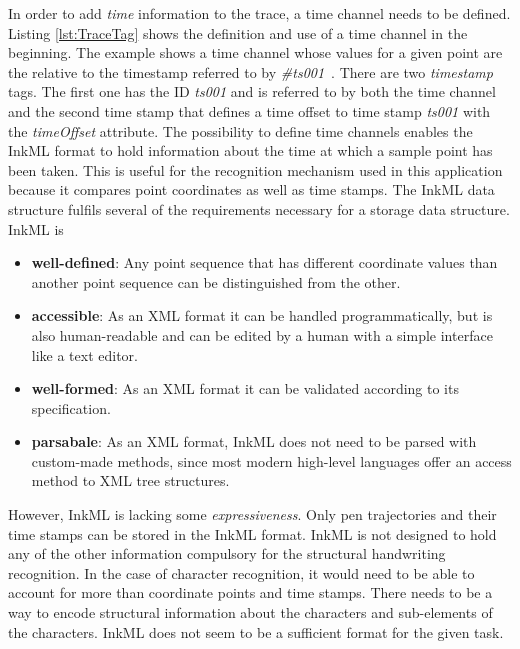 In order to add \emph{time} information to the trace,
a time channel needs to be defined. Listing \ref{lst:TraceTag} shows the 
definition and use of a time channel in the beginning. 
The example shows a time channel whose values for a given point are the 
relative to the timestamp referred to by 
\emph{\#ts001}~. There are two \emph{timestamp} tags.
The first one has the ID \emph{ts001} and is referred to by both the
time channel and the second time stamp that defines a time offset to time stamp
\emph{ts001} with the \emph{timeOffset} attribute.
The possibility to define time channels enables the InkML format to hold 
information about the time at which a sample point has been taken.
This is useful for the recognition mechanism used in this application
because it compares point coordinates as well as time stamps.
The InkML data structure fulfils several of the requirements necessary for a 
storage data structure. InkML is 
\begin{itemize}
  \item \textbf{well-defined}: Any point sequence that has different coordinate
        values than another point sequence can be distinguished from the other.
        
  \item \textbf{accessible}: As an XML format it can be handled programmatically,
        but is also human-readable and can be edited by a human with a simple
        interface like a text editor.

  \item \textbf{well-formed}: As an XML format it can be validated according to 
        its specification.

  \item \textbf{parsabale}: As an XML format, InkML does not need to be parsed 
        with custom-made methods, since most modern high-level languages offer
        an access method to XML tree structures.
\end{itemize}
However, InkML is lacking some \emph{expressiveness}. Only pen trajectories and
their time stamps can be stored in the InkML format. InkML is not designed 
to hold any of the other information compulsory for the structural handwriting
recognition. In the case of character recognition, it would need to be able to 
account for more than coordinate points and time stamps. There needs to be a 
way to encode structural information about the characters and sub-elements of 
the characters. InkML does not seem to be a sufficient format for the given task.

